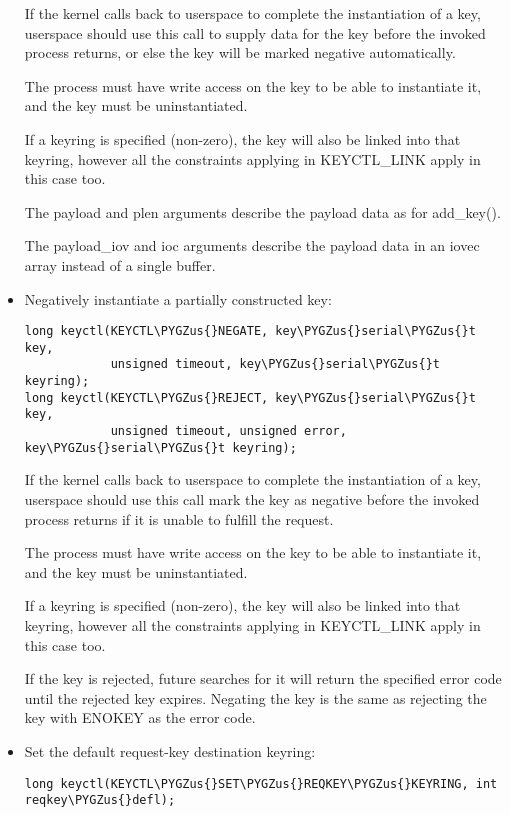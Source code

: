 \documentclass[a4paper,8pt,english]{sphinxmanual}
\def\PYGZus{\char`\_}
\begin{document}
\begin{itemize}
If the kernel calls back to userspace to complete the instantiation of a
key, userspace should use this call to supply data for the key before the
invoked process returns, or else the key will be marked negative
automatically.

The process must have write access on the key to be able to instantiate
it, and the key must be uninstantiated.

If a keyring is specified (non-zero), the key will also be linked into
that keyring, however all the constraints applying in KEYCTL\_LINK apply in
this case too.

The payload and plen arguments describe the payload data as for add\_key().

The payload\_iov and ioc arguments describe the payload data in an iovec
array instead of a single buffer.

\item {} 
Negatively instantiate a partially constructed key:

\begin{Verbatim}[commandchars=\\\{\}]
long keyctl(KEYCTL\PYGZus{}NEGATE, key\PYGZus{}serial\PYGZus{}t key,
            unsigned timeout, key\PYGZus{}serial\PYGZus{}t keyring);
long keyctl(KEYCTL\PYGZus{}REJECT, key\PYGZus{}serial\PYGZus{}t key,
            unsigned timeout, unsigned error, key\PYGZus{}serial\PYGZus{}t keyring);
\end{Verbatim}

If the kernel calls back to userspace to complete the instantiation of a
key, userspace should use this call mark the key as negative before the
invoked process returns if it is unable to fulfill the request.

The process must have write access on the key to be able to instantiate
it, and the key must be uninstantiated.

If a keyring is specified (non-zero), the key will also be linked into
that keyring, however all the constraints applying in KEYCTL\_LINK apply in
this case too.

If the key is rejected, future searches for it will return the specified
error code until the rejected key expires.  Negating the key is the same
as rejecting the key with ENOKEY as the error code.

\item {} 
Set the default request-key destination keyring:

\begin{Verbatim}[commandchars=\\\{\}]
long keyctl(KEYCTL\PYGZus{}SET\PYGZus{}REQKEY\PYGZus{}KEYRING, int reqkey\PYGZus{}defl);
\end{Verbatim}


\end{itemize}
\end{document}
